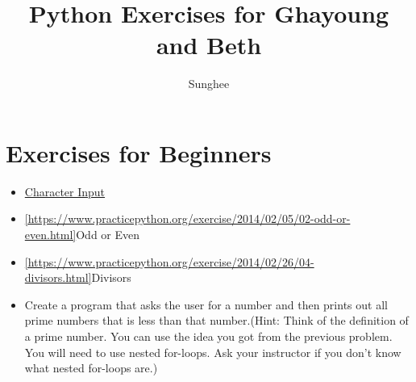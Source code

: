 \documentclass{article}
\title{Python Exercises for Ghayoung and Beth}
\author{Sunghee}
\begin{document}
\section{Exercises for Beginners}

\begin{itemize}
\item \href{https://www.practicepython.org/exercise/2014/01/29/01-character-input.html}{Character Input}

\item \ref{https://www.practicepython.org/exercise/2014/02/05/02-odd-or-even.html}{Odd or Even}

\item \ref{https://www.practicepython.org/exercise/2014/02/26/04-divisors.html}{Divisors}

\item Create a program that asks the user for a number and then prints out all prime numbers that is less than that number.(Hint: Think of the definition of a prime number. You can use the idea you got from the previous problem. You will need to use nested for-loops. Ask your instructor if you don't know what nested for-loops are.)

\end{itemize}
\end{document}
